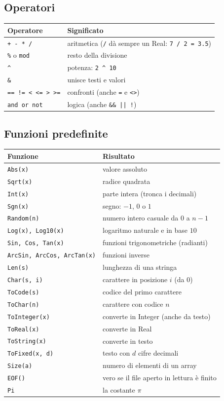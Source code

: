 \documentclass[11pt,a4paper]{article}
\newcommand{\code}[1]{\colorbox{ofSurface}{\texttt{\small #1}}}
\begin{document}
\subsection{Operatori}
\begin{tabularx}{\linewidth}{l X}
  \toprule
  \textbf{Operatore} & \textbf{Significato} \\
  \midrule
  \code{+ - * /} & aritmetica (\code{/} dà sempre un Real: \code{7 / 2 = 3.5}) \\
  \code{\%} o \code{mod} & resto della divisione \\
  \code{\^{}} & potenza: \code{2 \^{} 10} \\
  \code{\&} & unisce testi e valori \\
  \code{== != < <= > >=} & confronti (anche \code{=} e \code{<>}) \\
  \code{and or not} & logica (anche \code{\&\& || !}) \\
  \bottomrule
\end{tabularx}

\subsection{Funzioni predefinite}
\begin{longtable}{l p{10.5cm}}
  \toprule
  \textbf{Funzione} & \textbf{Risultato} \\
  \midrule
  \endhead
  \bottomrule
  \endfoot
  \code{Abs(x)} & valore assoluto \\
  \code{Sqrt(x)} & radice quadrata \\
  \code{Int(x)} & parte intera (tronca i decimali) \\
  \code{Sgn(x)} & segno: $-1$, $0$ o $1$ \\
  \code{Random(n)} & numero intero casuale da $0$ a $n-1$ \\
  \code{Log(x), Log10(x)} & logaritmo naturale e in base $10$ \\
  \code{Sin, Cos, Tan(x)} & funzioni trigonometriche (radianti) \\
  \code{ArcSin, ArcCos, ArcTan(x)} & funzioni inverse \\
  \code{Len(s)} & lunghezza di una stringa \\
  \code{Char(s, i)} & carattere in posizione $i$ (da $0$) \\
  \code{ToCode(s)} & codice del primo carattere \\
  \code{ToChar(n)} & carattere con codice $n$ \\
  \code{ToInteger(x)} & converte in Integer (anche da testo) \\
  \code{ToReal(x)} & converte in Real \\
  \code{ToString(x)} & converte in testo \\
  \code{ToFixed(x, d)} & testo con $d$ cifre decimali \\
  \code{Size(a)} & numero di elementi di un array \\
  \code{EOF()} & vero se il file aperto in lettura è finito \\
  \code{Pi} & la costante $\pi$ \\
\end{longtable}
\end{document}
